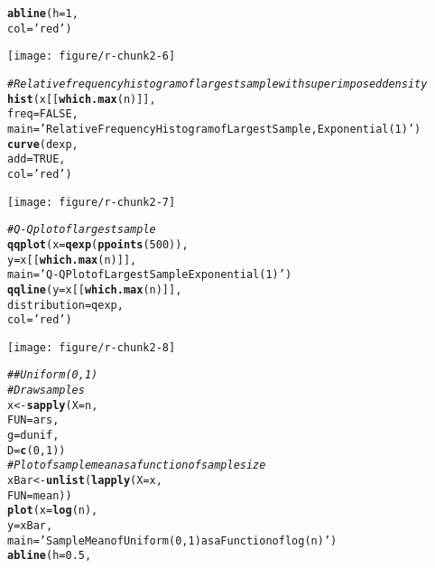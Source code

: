 \documentclass{article}\usepackage[]{graphicx}\usepackage[]{color}
\makeatletter
\def\maxwidth{ %
  \ifdim\Gin@nat@width>\linewidth
    \linewidth
  \else
    \Gin@nat@width
  \fi
}
\newcommand{\hlnum}[1]{\textcolor[rgb]{0.686,0.059,0.569}{#1}}%
\newcommand{\hlstr}[1]{\textcolor[rgb]{0.192,0.494,0.8}{#1}}%
\newcommand{\hlcom}[1]{\textcolor[rgb]{0.678,0.584,0.686}{\textit{#1}}}%
\newcommand{\hlstd}[1]{\textcolor[rgb]{0.345,0.345,0.345}{#1}}%
\newcommand{\hlkwb}[1]{\textcolor[rgb]{0.69,0.353,0.396}{#1}}%
\newcommand{\hlkwc}[1]{\textcolor[rgb]{0.333,0.667,0.333}{#1}}%
\newcommand{\hlkwd}[1]{\textcolor[rgb]{0.737,0.353,0.396}{\textbf{#1}}}%
\newenvironment{kframe}{%
 \def\at@end@of@kframe{}%
 \ifinner\ifhmode%
  \def\at@end@of@kframe{\end{minipage}}%
  \begin{minipage}{\columnwidth}%
 \fi\fi%
 \def\FrameCommand##1{\hskip\@totalleftmargin \hskip-\fboxsep
 \colorbox{shadecolor}{##1}\hskip-\fboxsep
     \hskip-\linewidth \hskip-\@totalleftmargin \hskip\columnwidth}%
 \MakeFramed {\advance\hsize-\width
   \@totalleftmargin\z@ \linewidth\hsize
   \@setminipage}}%
 {\par\unskip\endMakeFramed%
 \at@end@of@kframe}
\newenvironment{knitrout}{}{} %
\makeatother
\begin{document}
\begin{knitrout}
\begin{kframe}
\begin{alltt}
  \hlkwd{abline}\hlstd{(}\hlkwc{h} \hlstd{=} \hlnum{1}\hlstd{,}
         \hlkwc{col} \hlstd{=} \hlstr{'red'}\hlstd{)}
\end{alltt}
\end{kframe}
\texttt{[image: figure/r-chunk2-6]} 
\begin{kframe}\begin{alltt}
  \hlcom{# Relative frequency histogram of largest sample with superimposed density}
  \hlkwd{hist}\hlstd{(x[[}\hlkwd{which.max}\hlstd{(n)]],}
       \hlkwc{freq} \hlstd{=} \hlnum{FALSE}\hlstd{,}
       \hlkwc{main} \hlstd{=} \hlstr{'Relative Frequency Histogram of Largest Sample, Exponential (1)'}\hlstd{)}
  \hlkwd{curve}\hlstd{(dexp,}
        \hlkwc{add} \hlstd{=} \hlnum{TRUE}\hlstd{,}
        \hlkwc{col} \hlstd{=} \hlstr{'red'}\hlstd{)}
\end{alltt}
\end{kframe}
\texttt{[image: figure/r-chunk2-7]} 
\begin{kframe}\begin{alltt}
  \hlcom{# Q-Q plot of largest sample}
  \hlkwd{qqplot}\hlstd{(}\hlkwc{x} \hlstd{=} \hlkwd{qexp}\hlstd{(}\hlkwd{ppoints}\hlstd{(}\hlnum{500}\hlstd{)),}
         \hlkwc{y} \hlstd{= x[[}\hlkwd{which.max}\hlstd{(n)]],}
         \hlkwc{main} \hlstd{=} \hlstr{'Q-Q Plot of Largest Sample Exponential (1)'}\hlstd{)}
  \hlkwd{qqline}\hlstd{(}\hlkwc{y} \hlstd{= x[[}\hlkwd{which.max}\hlstd{(n)]],}
         \hlkwc{distribution} \hlstd{= qexp,}
         \hlkwc{col} \hlstd{=} \hlstr{'red'}\hlstd{)}
\end{alltt}
\end{kframe}
\texttt{[image: figure/r-chunk2-8]} 
\begin{kframe}\begin{alltt}
  \hlcom{## Uniform (0,1)}
  \hlcom{# Draw samples}
  \hlstd{x} \hlkwb{<-} \hlkwd{sapply}\hlstd{(}\hlkwc{X} \hlstd{= n,}
              \hlkwc{FUN} \hlstd{= ars,}
              \hlkwc{g} \hlstd{= dunif,}
              \hlkwc{D} \hlstd{=} \hlkwd{c}\hlstd{(}\hlnum{0}\hlstd{,}\hlnum{1}\hlstd{))}
  \hlcom{# Plot of sample mean as a function of sample size}
  \hlstd{xBar} \hlkwb{<-} \hlkwd{unlist}\hlstd{(}\hlkwd{lapply}\hlstd{(}\hlkwc{X} \hlstd{= x,}
                        \hlkwc{FUN} \hlstd{= mean))}
  \hlkwd{plot}\hlstd{(}\hlkwc{x} \hlstd{=} \hlkwd{log}\hlstd{(n),}
       \hlkwc{y} \hlstd{= xBar,}
       \hlkwc{main} \hlstd{=} \hlstr{'Sample Mean of Uniform (0,1) as a Function of log(n)'}\hlstd{)}
  \hlkwd{abline}\hlstd{(}\hlkwc{h} \hlstd{=} \hlnum{0.5}\hlstd{,}

\end{alltt}
\end{kframe}
\end{knitrout}
\end{document}
